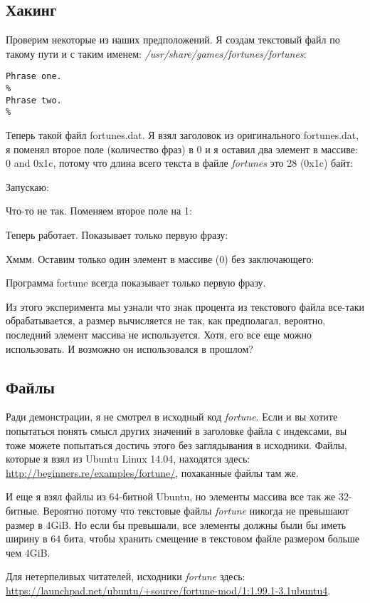\subsection{Хакинг}

Проверим некоторые из наших предположений.
Я создам текстовый файл по такому пути и с таким именем: \emph{/usr/share/games/fortunes/fortunes}:

\begin{lstlisting}
Phrase one.
%
Phrase two.
%
\end{lstlisting}

Теперь такой файл fortunes.dat. Я взял заголовок из оригинального fortunes.dat, я поменял второе поле
(количество фраз) в 0 и я оставил два элемент в массиве:
0 and 0x1c, потому что длина всего текста в файле \emph{fortunes} это 28 (0x1c) байт:



Запускаю:



Что-то не так. Поменяем второе поле на 1:



Теперь работает. Показывает только первую фразу:



Хммм. Оставим только один элемент в массиве (0) без заключающего:



Программа fortune всегда показывает только первую фразу.

Из этого эксперимента мы узнали что знак процента из текстового файла все-таки обрабатывается, а размер вычисляется
не так, как предполагал, вероятно, последний элемент массива не используется.
Хотя, его все еще можно использовать. И возможно он использовался в прошлом?


\subsection{Файлы}

Ради демонстрации, я не смотрел в исходный код \emph{fortune}.
Если и вы хотите попытаться понять смысл других значений в заголовке файла с индексами, вы тоже можете попытаться
достичь этого без заглядывания в исходники.
Файлы, которые я взял из Ubuntu Linux 14.04, находятся здесь: \url{http://beginners.re/examples/fortune/}, похаканные
файлы там же.

И еще я взял файлы из 64-битной Ubuntu, но элементы массива все так же 32-битные.
Вероятно потому что текстовые файлы \emph{fortune} никогда не превышают размер в 4\ac{GiB}.
Но если бы превышали, все элементы должны были бы иметь ширину в 64 бита, чтобы хранить смещение в текстовом файле
размером больше чем 4GiB.

Для нетерпеливых читателей, исходники \emph{fortune} здесь:
\url{https://launchpad.net/ubuntu/+source/fortune-mod/1:1.99.1-3.1ubuntu4}.

